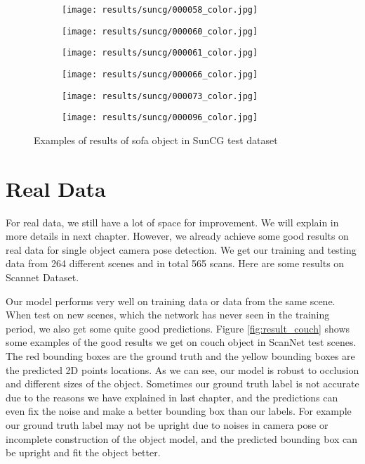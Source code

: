 \begin{figure}[h!]
\begin{subfigure}[b]{0.32\linewidth}
    \texttt{[image: results/suncg/000058\_color.jpg]}
  \end{subfigure}
  \begin{subfigure}[b]{0.32\linewidth}
    \texttt{[image: results/suncg/000060\_color.jpg]}
  \end{subfigure}
  \begin{subfigure}[b]{0.32\linewidth}
    \texttt{[image: results/suncg/000061\_color.jpg]}
  \end{subfigure}
  \begin{subfigure}[b]{0.32\linewidth}
    \texttt{[image: results/suncg/000066\_color.jpg]}
  \end{subfigure}
  \begin{subfigure}[b]{0.32\linewidth}
    \texttt{[image: results/suncg/000073\_color.jpg]}
  \end{subfigure}
  \begin{subfigure}[b]{0.32\linewidth}
    \texttt{[image: results/suncg/000096\_color.jpg]}
  \end{subfigure}
  \caption{Examples of results of sofa object in SunCG test dataset}
  \label{fig:suncg}
\end{figure}

\section{Real Data}

For real data, we still have a lot of space for improvement. We will explain in more details in next chapter. However, we already achieve some good results on real data for single object camera pose detection. We get our training and testing data from 264 different scenes and in total 565 scans. Here are some results on Scannet Dataset.

Our model performs very well on training data or data from the same scene. When test on new scenes, which the network has never seen in the training period, we also get some quite good predictions. Figure \ref{fig:result_couch} shows some examples of the good results we get on couch object in ScanNet test scenes. The red bounding boxes are the ground truth and the yellow bounding  boxes are the predicted 2D points locations. As we can see, our model is robust to occlusion and different sizes of the object. Sometimes our ground truth label is not accurate due to the reasons we have explained in last chapter, and the predictions can even fix the noise and make a better bounding box than our labels. For example our ground truth label may not be upright due to noises in camera pose or incomplete construction of the object model, and the predicted bounding box can be upright and fit the object better.

